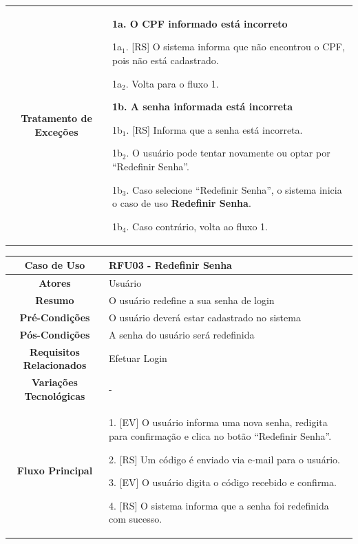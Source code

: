 \begin{apendicesenv}
\begin{quadro}[htb]
\begin{tabular}{|c|p{11cm}|}
		\textbf{Tratamento de Exceções} &
		\parbox[t]{11cm}{
			\raggedright
			\textbf{1a. O CPF informado está incorreto}\par
			1a$_1$. [RS] O sistema informa que não encontrou o CPF, pois não está cadastrado.\par
			1a$_2$. Volta para o fluxo 1.\par
			
			\textbf{1b. A senha informada está incorreta}\par
			1b$_1$. [RS] Informa que a senha está incorreta.\par
			1b$_2$. O usuário pode tentar novamente ou optar por ``Redefinir Senha''.\par
			1b$_3$. Caso selecione ``Redefinir Senha'', o sistema inicia o caso de uso \textbf{Redefinir Senha}.\par
			1b$_4$. Caso contrário, volta ao fluxo 1.
		}
		\\ \hline
	\end{tabular}
	
\end{quadro}

\begin{quadro}[htb]
	\centering
	\caption{\label{quadro_rfu03}Caso de Uso Redefinir Senha (Baixo Nível)}
	\small
	\renewcommand{\arraystretch}{1.1}
	
	\begin{tabular}{|c|p{11cm}|}
		\hline
		\textbf{Caso de Uso} & RFU03 - Redefinir Senha \\ \hline
		\textbf{Atores} & Usuário \\ \hline
		\textbf{Resumo} & O usuário redefine a sua senha de login \\ \hline
		\textbf{Pré-Condições} & O usuário deverá estar cadastrado no sistema \\ \hline
		\textbf{Pós-Condições} & A senha do usuário será redefinida \\ \hline
		\textbf{Requisitos Relacionados} & Efetuar Login \\ \hline
		\textbf{Variações Tecnológicas} & - \\ \hline
		
		\textbf{Fluxo Principal} &
		\parbox[t]{11cm}{
			\raggedright
			1. [EV] O usuário informa uma nova senha, redigita para confirmação e clica no botão ``Redefinir Senha''.\par
			2. [RS] Um código é enviado via e-mail para o usuário.\par
			3. [EV] O usuário digita o código recebido e confirma.\par
			4. [RS] O sistema informa que a senha foi redefinida com sucesso.
		}
		\\ \hline
		

\end{tabular}
\end{quadro}
\end{apendicesenv}

